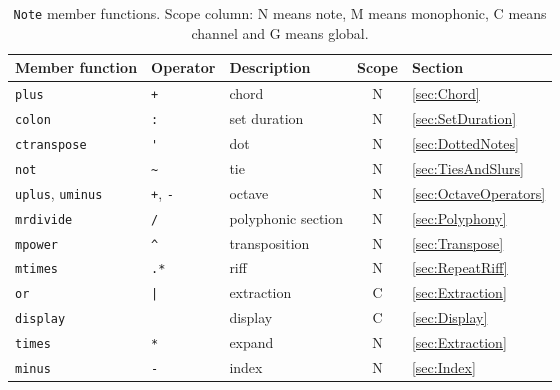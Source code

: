 \documentclass{article}
\begin{document}
\begin{table}
	\centering
	\begin{tabular}{lllcl}
		Member function & Operator & Description & Scope & Section \\
		\hline
		\lstinline!plus! & \lstinline!+! & chord & N & \ref{sec:Chord} \\
		\lstinline!colon! & \lstinline!:! & set duration & N & \ref{sec:SetDuration} \\
		\lstinline!ctranspose! & \lstinline!'! & dot & N & \ref{sec:DottedNotes} \\
		\lstinline!not! & \lstinline!~! & tie & N & \ref{sec:TiesAndSlurs} \\
		\lstinline!uplus!, \lstinline!uminus! & \lstinline!+!, \lstinline!-! & octave & N & \ref{sec:OctaveOperators} \\
		\lstinline!mrdivide! & \lstinline!/! & polyphonic section & N & \ref{sec:Polyphony} \\
		\lstinline!mpower! & \lstinline!^! & transposition & N & \ref{sec:Transpose} \\
		\lstinline!mtimes! & \lstinline!.*! & riff & N & \ref{sec:RepeatRiff} \\
		\lstinline!or! & \lstinline!|! & extraction & C & \ref{sec:Extraction} \\
		\lstinline!display!& & display & C & \ref{sec:Display} \\
		\lstinline!times! & \lstinline!*! & expand & N & \ref{sec:Extraction} \\
		\lstinline!minus! & \lstinline!-! & index & N & \ref{sec:Index} \\
	\end{tabular}
	\caption[\lstinline!Note! member functions]{\lstinline!Note! member functions. Scope column: N means note, M means monophonic, C means channel and G means global.}
	\label{tab:NoteFunctions}
\end{table}
\end{document}
